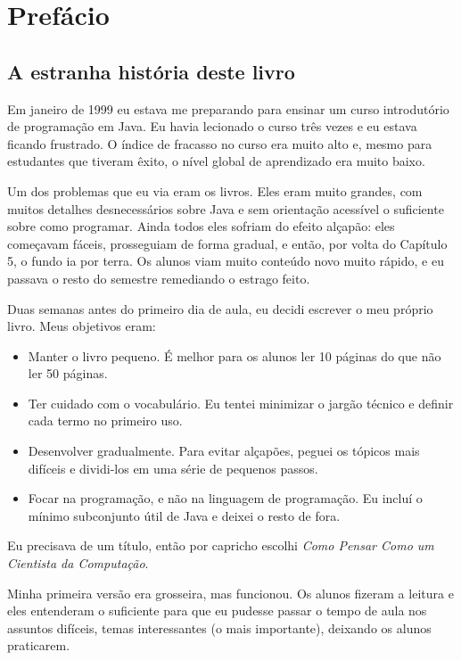 \documentclass[10pt]{book}
\begin{document}
\chapter{Prefácio}

\section*{A estranha história deste livro}

Em janeiro de 1999 eu estava me preparando para ensinar um curso introdutório de
programação em Java. Eu havia lecionado o curso três vezes e eu estava ficando
frustrado. O índice de fracasso no curso era muito alto e, mesmo para
estudantes que tiveram êxito, o nível global de aprendizado era muito baixo.

Um dos problemas que eu via eram os livros.  
Eles eram muito grandes, com muitos detalhes desnecessários sobre Java e
sem orientação acessível o suficiente sobre como programar. Ainda todos eles
sofriam do efeito alçapão: eles começavam fáceis,
prosseguiam de forma gradual, e então, por volta do Capítulo 5, o fundo
ia por terra. Os alunos viam muito conteúdo novo muito rápido,
e eu passava o resto do semestre remediando o estrago feito.

Duas semanas antes do primeiro dia de aula, eu decidi escrever o meu
próprio livro.
Meus objetivos eram:

\begin{itemize}

\item Manter o livro pequeno. É melhor para os alunos ler 10 páginas
do que não ler 50 páginas.

\item Ter cuidado com o vocabulário. Eu tentei minimizar o jargão técnico
e definir cada termo no primeiro uso.

\item Desenvolver gradualmente. Para evitar alçapões, peguei os tópicos
mais difíceis e dividi-los em uma série de pequenos passos.

\item Focar na programação, e não na linguagem de programação. Eu incluí
o mínimo subconjunto útil de Java e deixei o resto de fora.

\end{itemize}

Eu precisava de um título, então por capricho escolhi {\em Como Pensar Como
um Cientista da Computação}.

Minha primeira versão era grosseira, mas funcionou. Os alunos fizeram a leitura
e eles entenderam o suficiente para que eu pudesse passar o tempo de aula nos
assuntos difíceis, temas interessantes (o mais importante), deixando
os alunos praticarem.
\end{document}
